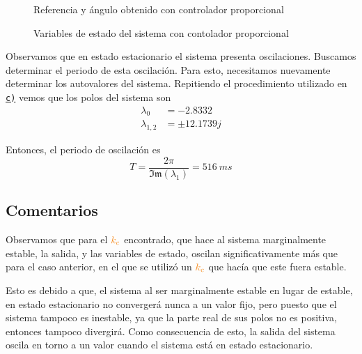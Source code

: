 \begin{figure}[h]
  \centering
  
  \caption{Referencia y ángulo obtenido con controlador proporcional}\label{fig:psi-prop-marge}
\end{figure}

\begin{figure}[h]
  \centering
  
  \caption{Variables de estado del sistema con contolador proporcional}\label{fig:estado-prop-marge}
\end{figure}

Observamos que en estado estacionario el sistema presenta oscilaciones. Buscamos
determinar el periodo de esta oscilación. Para esto, necesitamos nuevamente determinar
los autovalores del sistema. Repitiendo el procedimiento utilizado en \hyperref[pregunta-c]{\texttt{c)}}
vemos que los polos del sistema son
\begin{align*}
    \lambda_{0} &= -2.8332 \\
    \lambda_{1,2} &= \pm 12.1739j
\end{align*}

Entonces, el periodo de oscilación es
\begin{equation}
    T = \frac{2\pi}{\mathfrak{Im}(\lambda_{1})} = 516\ \unit{ms}
\end{equation}

\subsection{Comentarios}

Observamos que para el $\nara{k_{c}}$ encontrado, que hace al sistema marginalmente
estable, la salida, y las variables de estado, oscilan significativamente más que
para el caso anterior, en el que se utilizó un $\nara{k_{c}}$ que hacía que este
fuera estable.

Esto es debido a que, el sistema al ser marginalmente estable en lugar de estable,
en estado estacionario no convergerá nunca a un valor fijo, pero puesto que el
sistema tampoco es inestable, ya que la parte real de sus polos no es positiva,
entonces tampoco divergirá. Como consecuencia de esto, la salida del sistema
oscila en torno a un valor cuando el sistema está en estado estacionario.
